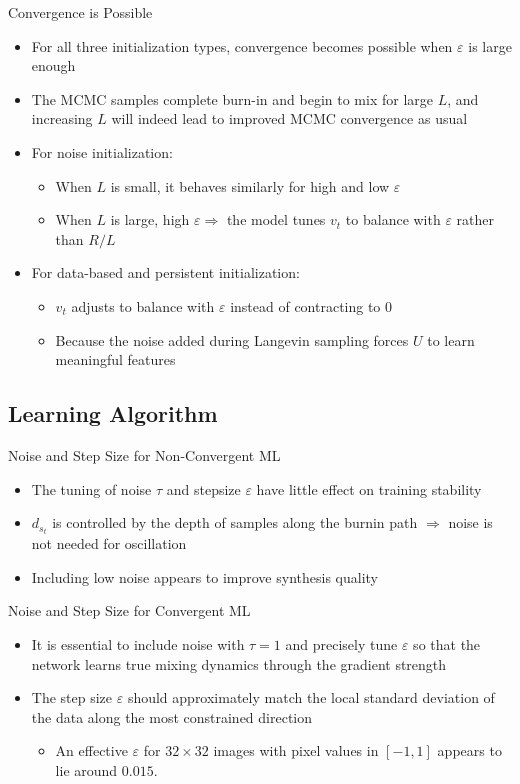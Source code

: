 \documentclass{beamer}
\begin{document}
\begin{frame}{Convergence is Possible}
\begin{itemize}
\item For all three initialization types, convergence becomes possible when $\varepsilon$ is large enough
\item The MCMC samples
complete burn-in and begin to mix for large $L$, and increasing
$L$ will indeed lead to improved MCMC convergence as
usual
\item For noise initialization:
\begin{itemize}
\item When $L$ is small, it behaves similarly for high and low $\varepsilon$
\item When $L$ is large, high $\varepsilon\Rightarrow$ the model tunes $v_t$ to balance with $\varepsilon$ rather than $R/L$
\end{itemize}
\item For data-based and persistent initialization:
\begin{itemize}
\item $v_t$ adjusts to balance with $\varepsilon$ instead of contracting to $0$
\item Because the noise added during Langevin sampling forces
$U$ to learn meaningful features
\end{itemize}
\end{itemize}
\end{frame}

\subsection{Learning Algorithm}
\begin{frame}{Noise and Step Size for Non-Convergent ML}
\begin{itemize}
\item The tuning of noise $\tau$ and stepsize $\varepsilon$
have little effect on training stability
\item $d_{s_t}$ is controlled by the depth of samples along the burnin
path $\Rightarrow$ noise is not needed for oscillation
\item Including low noise appears to improve synthesis
quality
\end{itemize}
\end{frame}

\begin{frame}{Noise and Step Size for Convergent ML}
\begin{itemize}
\item It is essential to include noise with
$\tau=1$ and precisely tune $\varepsilon$ so that the network learns
true mixing dynamics through the gradient strength
\item The
step size $\varepsilon$ should approximately match the local standard
deviation of the data along the most constrained direction
\begin{itemize}
\item An effective $\varepsilon$ for $32\times32$ images with pixel values in $[-1,1]$ appears to lie around $0.015$.
\end{itemize}
\end{itemize}
\end{frame}
\end{document}
